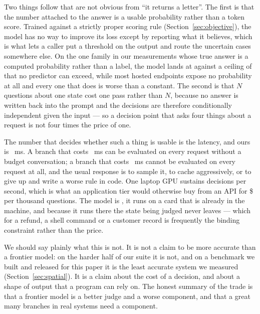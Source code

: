 \documentclass[11pt]{article}
\newcommand{\1}{\mathbf{1}}
\begin{document}
Two things follow that are not obvious from ``it returns a letter''. The first is that the number
attached to the answer is a usable probability rather than a token score. Trained against a
strictly proper scoring rule (Section~\ref{sec:objective}), the model has no way to improve its
loss except by reporting what it believes, which is what lets a caller put a threshold on the
output and route the uncertain cases somewhere else. On the one family in our measurements whose
true answer is a computed probability rather than a label, the model lands at
\simOursAccEvent{} against a ceiling of \simCeilEvent{} that no predictor can exceed, while most
hosted endpoints expose no probability at all and every one that does is worse than a constant.
The second is that $N$ questions about one state cost one pass rather than $N$, because no answer
is written back into the prompt and the decisions are therefore conditionally independent given the
input --- so a decision point that asks four things about a request is not four times the price of
one.

The number that decides whether such a thing is usable is the latency, and ours is
\oursMsPerDecision~ms. A branch that costs \oursMsPerDecision~ms can be evaluated on every request
without a budget conversation; a branch that costs \apiclaudeopusfiveMs{}~ms cannot be evaluated on
every request at all, and the usual response is to sample it, to cache aggressively, or to give up
and write a worse rule in code. One laptop GPU sustains \oursPerSecond{} decisions per second, which
is what an application tier would otherwise buy from an API for \$\apiclaudeopusfiveCost{} per
thousand questions. The model is \paramCount{}, it runs on a card that is already in the machine,
and because it runs there the state being judged never leaves --- which for a refund, a shell
command or a customer record is frequently the binding constraint rather than the price.

We should say plainly what this is not. It is not a claim to be more accurate than a frontier
model: on the harder half of our suite it is not, and on a benchmark we built and released for this
paper it is the least accurate system we measured (Section~\ref{sec:spatial}). It is a claim about
the cost of a decision, and about a shape of output that a program can rely on. The honest summary
of the trade is that a frontier model is a better judge and a worse component, and that a great
many branches in real systems need a component.
\end{document}

